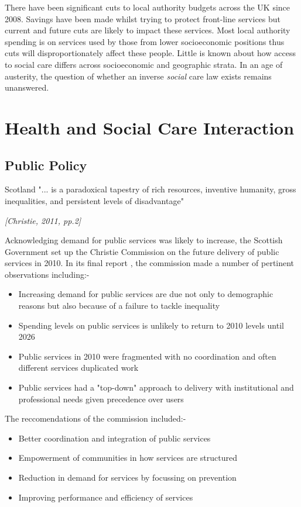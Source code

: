 \documentclass[12pt,]{report}
\begin{document}
There have been significant cuts to local authority budgets across the
UK since 2008. Savings have been made whilst trying to protect
front-line services but current and future cuts are likely to impact
these services. Most local authority spending is on services used by
those from lower socioeconomic positions thus cuts will
disproportionately affect these people. Little is known about how access
to social care differs across socioeconomic and geographic strata. In an
age of austerity, the question of whether an inverse \textit{social}
care law exists remains unanswered.

\section{Health and Social Care Interaction}\label{sec:hsc-interaction}

\subsection{Public Policy}\label{subsec:policy}

\epigraph{Scotland "... is a paradoxical tapestry of rich resources, inventive humanity, gross inequalities, and persistent levels of disadvantage"}{\textit{[Christie, 2011, pp.2]}}

Acknowledging demand for public services was likely to increase, the
Scottish Government set up the Christie Commission on the future
delivery of public services in 2010. In its final report \citep{RN451},
the commission made a number of pertinent observations including:-

\begin{itemize}[noitemsep]
\item Increasing demand for public services are due not only to demographic reasons but also because of a failure to tackle inequality
\item Spending levels on public services is unlikely to return to 2010 levels until 2026
\item Public services in 2010 were fragmented with no coordination and often different services duplicated work
\item Public services had a "top-down" approach to delivery with institutional and professional needs given precedence over users
\end{itemize}

The reccomendations of the commission included:-

\begin{itemize}[noitemsep]
\item Better coordination and integration of public services
\item Empowerment of communities in how services are structured
\item Reduction in demand for services by focussing on prevention
\item Improving performance and efficiency of services
\end{itemize}
\end{document}
